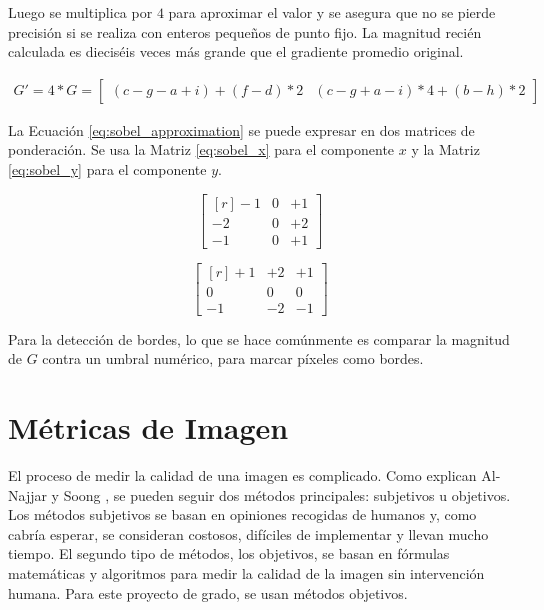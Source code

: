 \documentclass[pregrado]{tesis-usb} %
\begin{document}
Luego se multiplica por $4$ para aproximar el valor y se asegura que no se pierde precisión si se realiza con enteros pequeños de punto fijo. La magnitud recién calculada es dieciséis veces más grande que el gradiente promedio original.

\begin{equation}\label{eq:sobel_approximation}
\begin{split}
G' = 4 * G =\begin{bmatrix*}(c-g-a+i)+(f-d)*2 & (c-g+a-i)*4+(b-h)*2\end{bmatrix*}
\end{split}
\end{equation}

La Ecuación \ref{eq:sobel_approximation} se puede expresar en dos matrices de ponderación. Se usa la Matriz \ref{eq:sobel_x} para el componente $x$ y la Matriz \ref{eq:sobel_y} para el componente $y$.

\begin{equation}
\begin{bmatrix*}[r]\label{eq:sobel_x}
-1 &  0 & +1 \\
-2 &  0 & +2 \\
-1 &  0 & +1
\end{bmatrix*}
\end{equation}

\begin{equation}
\begin{bmatrix*}[r]\label{eq:sobel_y}
+1 & +2 & +1 \\
 0 &  0 &  0 \\
-1 & -2 & -1
\end{bmatrix*}
\end{equation}

Para la detección de bordes, lo que se hace comúnmente es comparar la magnitud de $G$ contra un umbral numérico, para marcar píxeles como bordes.

\section{Métricas de Imagen}
El proceso de medir la calidad de una imagen es complicado. Como explican Al-Najjar y Soong \cite{Yusra2012}, se pueden seguir dos métodos principales: subjetivos u objetivos. Los métodos subjetivos se basan en opiniones recogidas de humanos y, como cabría esperar, se consideran costosos, difíciles de implementar y llevan mucho tiempo. El segundo tipo de métodos, los objetivos, se basan en fórmulas matemáticas y algoritmos para medir la calidad de la imagen sin intervención humana. Para este proyecto de grado, se usan métodos objetivos.
\end{document}
